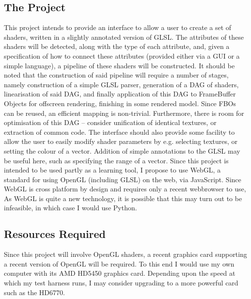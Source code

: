 \subsection*{The Project}
This project intends to provide an interface to allow a user to create a set of shaders, written in a
slightly annotated version of GLSL. The attributes of these shaders will be detected, along with the
type of each attribute, and, given a specification of how to connect these attributes (provided either
via a GUI or a simple language), a pipeline of these shaders will be constructed.
It should be noted that the construction of said pipeline will require a number of stages, namely
construction of a simple GLSL parser, generation of a DAG of shaders, linearisation of said DAG,
and finally application of this DAG to FrameBuffer Objects for offscreen rendering, finishing in
some rendered model. Since FBOs can be reused, an efficient mapping is non-trivial. Furthermore,
there is room for optimisation of this DAG – consider unification of identical textures, or extraction
of common code.
The interface should also provide some facility to allow the user to easily modify shader parameters
by e.g. selecting textures, or setting the colour of a vector. Addition of simple annotations to the
GLSL may be useful here, such as specifying the range of a vector.
Since this project is intended to be used partly as a learning tool, I propose to use WebGL, a
standard for using OpenGL (including GLSL) on the web, via JavaScript. Since WebGL is cross
platform by design and requires only a recent webbrowser to use, As WebGL is quite a new
technology, it is possible that this may turn out to be infeasible, in which case I would use Python.

\subsection*{Resources Required}
Since this project will involve OpenGL shaders, a recent graphics card supporting a recent version
of OpenGL will be required. To this end I would use my own computer with its AMD HD5450
graphics card. Depending upon the speed at which my test harness runs, I may consider upgrading
to a more powerful card such as the HD6770.

